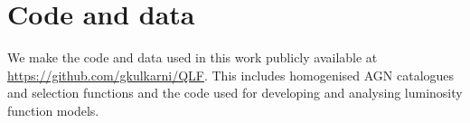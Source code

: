 \documentclass[fleqn,usenatbib]{mnras}
\begin{document}
\section{Code and data}
\label{sec:code}

We make the code and data used in this work publicly available at
\url{https://github.com/gkulkarni/QLF}.  This includes homogenised AGN
catalogues and selection functions and the code used for developing
and analysing luminosity function models.




\bsp
\label{lastpage}
\end{document}
